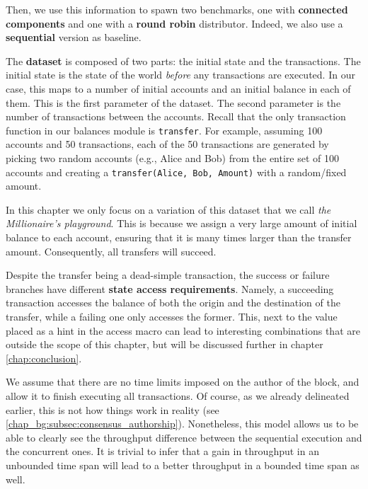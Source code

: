 Then, we use this information to spawn two benchmarks, one with \textbf{connected components} and
one with a \textbf{round robin} distributor. Indeed, we also use a \textbf{sequential} version as
baseline.

The \textbf{dataset} is composed of two parts: the initial state and the transactions.
%
%
The initial state is the state of the world \textit{before} any transactions are executed. In our
case, this maps to a number of initial accounts and an initial balance in each of them. This is the
first parameter of the dataset.
The second parameter is the number of transactions between the accounts. Recall that the only
transaction function in our balances module is \texttt{transfer}. For example, assuming 100 accounts
and 50 transactions, each of the 50 transactions are generated by picking two random accounts (e.g., Alice
and Bob) from the entire set of 100 accounts and creating a \texttt{transfer(Alice, Bob, Amount)} with a random/fixed amount.  

In this chapter we only focus on a variation of this dataset that we call \textit{the Millionaire's playground}.
This is because we assign a very large amount of initial balance to each account, ensuring that it
is many times larger than the transfer amount. Consequently, all transfers will succeed.

\begin{remark}
	Despite the transfer being a dead-simple transaction, the success or failure branches have
	different \textbf{state access requirements}. Namely, a succeeding transaction accesses the
	balance of both the origin and the destination of the transfer, while a failing one only
	accesses the former. This, next to the value placed as a hint in the access macro can lead to
	interesting combinations that are outside the scope of this chapter, but will be discussed 
	further in chapter \ref{chap:conclusion}.
\end{remark}

We assume that there are no time limits imposed on the author of the block, and allow it to finish
executing all transactions. Of course, as we already delineated earlier, this is not how things work
in reality (see \ref{chap_bg:subsec:consensus_authorship}). Nonetheless, this model allows us to be
able to clearly see the throughput difference between the sequential execution and the concurrent
ones. It is trivial to infer that a gain in throughput in an unbounded time span will lead to a
better throughput in a bounded time span as well.

